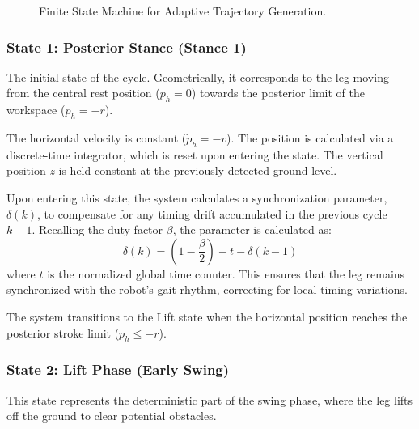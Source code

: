 \begin{figure}[htbp]
    \caption{Finite State Machine for Adaptive Trajectory Generation.}
    \label{fig:fsm_logic}
\end{figure}


\subsubsection{State 1: Posterior Stance (Stance 1)}

The initial state of the cycle. Geometrically, it corresponds to the leg moving from the central rest
position ($p_h = 0$) towards the posterior limit of the workspace ($p_h = -r$).

\newpage
The horizontal velocity is constant ($\dot{p}_h = -v$). The position is calculated via a discrete-time
integrator, which is reset upon entering the state. The vertical position $z$ is held constant at the
previously detected ground level.

Upon entering this state, the system calculates a synchronization parameter, $\delta(k)$, to compensate for any
timing drift accumulated in the previous cycle $k-1$. Recalling the duty factor $\beta$, the parameter is calculated as:
\begin{equation}
  \delta(k) = \left(1 - \frac{\beta}{2}\right) - t - \delta(k-1)
\end{equation}
where $t$ is the normalized global time counter. This ensures that the leg remains synchronized with the
robot's gait rhythm, correcting for local timing variations.

The system transitions to the Lift state when the horizontal position reaches the posterior stroke limit
($p_h \le -r$).


\subsubsection{State 2: Lift Phase (Early Swing)}

This state represents the deterministic part of the swing phase, where the leg lifts off the ground to clear
potential obstacles.


